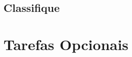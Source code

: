 \documentclass[12pt, a4paper, brazil, portuguese]{article}
\begin{document}
\subsection{Classifique}


\section{Tarefas Opcionais}
%
%
%
%
%
\end{document}
